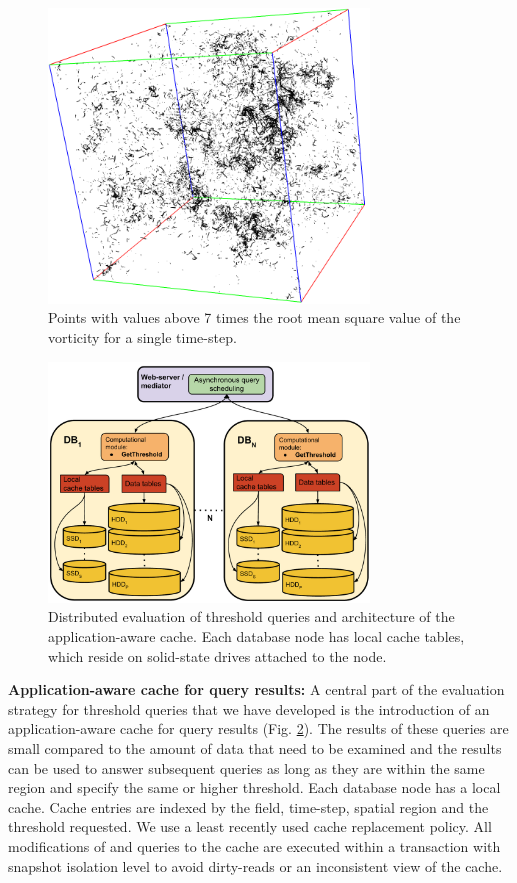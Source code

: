 \documentclass{sig-alternate}
\begin{document}
\begin{figure}
\centering
\includegraphics[width=3.35in]{Figures/points_7rms.png}
\caption{Points with values above 7 times the root mean square value of the vorticity for a single time-step.}
\label{fig:points_7rms}
\end{figure}

\begin{figure}
\centering
\includegraphics[width=3.35in]{Figures/cache_diagram.pdf}
\caption{Distributed evaluation of threshold queries and architecture of the application-aware cache. 
Each database node has local cache tables, which reside on solid-state drives attached to the node.}
\label{fig:cache_diagram}
\end{figure}

\vspace{5pt}
{\bf Application-aware cache for query results:} A central part of the evaluation strategy for threshold queries that we have developed is the 
introduction of an application-aware cache
for query results (Fig. \ref{fig:cache_diagram}). The results of these queries are small compared to the amount of data that need to be examined and the
results can be used to answer subsequent queries as long as they are within the same region and specify the same or higher threshold. Each database node 
has a local cache. Cache entries are indexed by the field, time-step, spatial region and the threshold requested. We use a least recently
used cache replacement policy. All modifications of and queries to the cache are executed within a transaction with snapshot isolation level to
avoid dirty-reads or an inconsistent view of the cache. 
\end{document}

